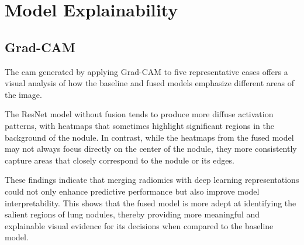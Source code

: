 \section{Model Explainability}

\subsection{Grad-CAM}

The \ac{cam} generated by applying Grad-CAM to five representative cases offers a visual analysis of how the baseline and fused models emphasize different areas of the image.

The ResNet model without fusion tends to produce more diffuse activation patterns, with heatmaps that sometimes highlight significant regions in the background of the nodule. In contrast, while the heatmaps from the fused model may not always focus directly on the center of the nodule, they more consistently capture areas that closely correspond to the nodule or its edges. 

These findings indicate that merging radiomics with deep learning representations could not only enhance predictive performance but also improve model interpretability. This shows that the fused model is more adept at identifying the salient regions of lung nodules, thereby providing more meaningful and explainable visual evidence for its decisions when compared to the baseline model.

